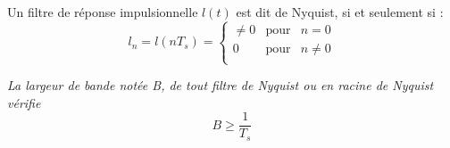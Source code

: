 	\begin{defn}
		Un filtre de réponse impulsionnelle $l(t)$ est dit de Nyquist, si et seulement si :
		$$l_{n} = l(nT_{s}) =
		\left\{ \begin{array}{rcr}
			\neq 0 & \text{pour} & n = 0 \\
			0      & \text{pour} & n \neq 0 \\
		\end{array} \right.$$
	\end{defn}
	
	\begin{pop}
	\textit{La largeur de bande notée B, de tout filtre de Nyquist ou en racine de Nyquist vérifie} $$B\geq \dfrac{1}{T_{s}}$$
	\end{pop}